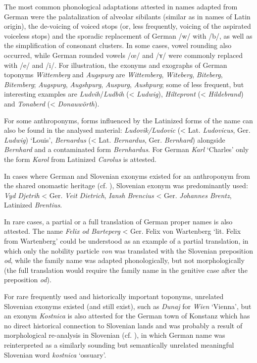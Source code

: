 \documentclass[output=paper,colorlinks,citecolor=brown,arabicfont,chinesefont]{langscibook}
\begin{document}
The most common phonological adaptations attested in names adapted from German were the palatalization of alveolar sibilants (similar as in names of Latin origin), the de-voicing of voiced stops (or, less frequently, voicing of the aspirated voiceless stops) and the sporadic replacement of German /w/ with /b/, as well as the simplification of consonant clusters. In some cases, vowel rounding also occurred, while German rounded vowels /œ/ and /ʏ/ were commonly replaced with /e/ and /i/. For illustration, the exonyms and exographs of German toponyms \emph{Wittemberg} and \emph{Augspurg} are \emph{Wittemberg}, \emph{Witeberg}, \emph{Biteberg}, \emph{Bitemberg}; \emph{Augspurg}, \emph{Augshpurg}, \emph{Auspurg}, \emph{Aushpurg}; some of less frequent, but interesting examples are \emph{Ludvih}/\emph{Ludbih} (< \emph{Ludwig}), \emph{Hiltepront} (< \emph{Hildebrand}) and \emph{Tonaberd} (< \emph{Donauwörth}). 

For some anthroponyms, forms influenced by the Latinized forms of the name can also be found in the analysed material: \emph{Ludovik/Ludovic} (< Lat. \emph{Ludovicus}, Ger. \emph{Ludwig}) ‘Louis’, \emph{Bernardus} (< Lat. \emph{Bernardus}, Ger. \emph{Bernhard}) alongside \emph{Bernhard} and a contaminated form \emph{Bernhardus}. For German \emph{Karl} ‘Charles’ only the form \emph{Karol} from Latinized \emph{Carolus} is attested.
 
In cases where German and Slovenian exonyms existed for an anthroponym from the shared onomastic heritage (cf. \citealt[98]{Raukko2017}), Slovenian exonym was predominantly used:  \emph{Vyd Djetrih} < Ger. \emph{Veit Dietrich}, \emph{Iansh Brencius} < Ger. \emph{Johannes Brentz}, Latinized \emph{Brentius}.

In rare cases, a partial or a full translation of German proper names is also attested. The name \emph{Felix od Barteperg} < Ger. Felix von Wartenberg ‘lit. Felix from Wartenberg’ could be understood as an example of a partial translation, in which only the nobility particle \emph{von} was translated with the Slovenian preposition \emph{od}, while the family name was adapted phonologically, but not morphologically (the full translation would require the family name in the genitive case after the preposition \emph{od}). 

For rare frequently used and historically important toponyms, unrelated Slovenian exonyms existed (and still exist), such as \emph{Dunaj} for \emph{Wien} ‘Vienna’, but an exonym \emph{Kostnica} is also attested for the German town of Konstanz which has no direct historical connection to Slovenian lands and was probably a result of morphological re-analysis in Slovenian (cf. \citealt[553]{Nicolaisen1996}), in which German name was reinterpreted as a similarly sounding  but semantically unrelated meaningful Slovenian word \emph{kostnica} ‘ossuary’.
\end{document}
